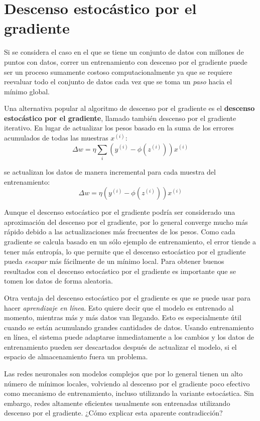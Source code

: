 \section{Descenso estocástico por el gradiente}
Si se considera el caso en el que se tiene un conjunto de datos con
millones de puntos con datos, correr un entrenamiento con descenso por
el gradiente puede ser un proceso sumamente costoso computacionalmente
ya que se requiere reevaluar todo el conjunto de datos cada vez que se
toma un \textit{paso} hacia el mínimo global.

Una alternativa popular al algoritmo de descenso por el gradiente es el
\textbf{descenso estocástico por el gradiente}, llamado también
descenso por el gradiente iterativo. En lugar de actualizar los pesos
basado en la suma de los errores acumulados de todas las muestras
$x^{(i)}$:
\begin{equation}
  \Delta w = \eta \sum_i(y^{(i)} - \phi(z^{(i)}))x^{(i)}
\end{equation}

se actualizan los datos de manera incremental para cada muestra del
entrenamiento:
\begin{equation}
  \Delta w = \eta(y^{(i)} - \phi(z^{(i)}))x^{(i)}
\end{equation}

Aunque el descenso estocástico por el gradiente podría ser considerado
una aproximación del descenso por el gradiente, por lo general
converge mucho más rápido debido a las actualizaciones más frecuentes
de los pesos. Como cada gradiente se calcula basado en un sólo ejemplo
de entrenamiento, el error tiende a tener más entropía, lo que
permite que el descenso estocástico por el gradiente
pueda \textit{escapar} más fácilmente de un mínimo local. Para obtener
buenos resultados con el descenso estocástico por el gradiente es
importante que se tomen los datos de forma aleatoria.

Otra ventaja del descenso estocástico por el gradiente es que se puede
usar para hacer \textit{aprendizaje en línea}. Esto quiere decir que
el modelo es entrenado al momento, mientras más y más datos van
llegando. Esto es especialmente útil cuando se están acumulando
grandes cantidades de datos.  Usando entrenamiento en línea, el
sistema puede adaptarse inmediatamente a los cambios y los datos de
entrenamiento pueden ser descartados después de actualizar el modelo,
si el espacio de almacenamiento fuera un problema.

Las redes neuronales son modelos complejos que por lo general tienen
un alto número de mínimos locales, volviendo al descenso por el
gradiente poco efectivo como mecanismo de entrenamiento, incluso
utilizando la variante estocástica. Sin embargo, redes altamente
eficientes usualmente son entrenadas utilizando descenso por el
gradiente. ¿Cómo explicar esta aparente contradicción?

